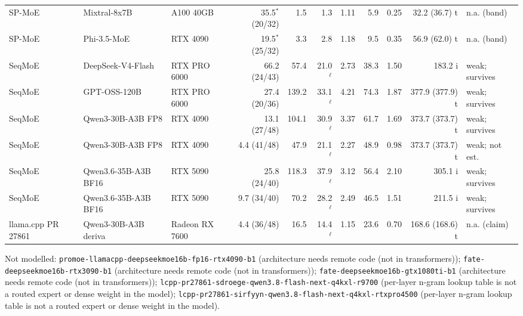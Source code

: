 {\begin{longtable}{p{2.2cm}p{2.1cm}p{1.5cm}rrrrrrrl}
SP-MoE & Mixtral-8x7B & A100 40GB & 35.5$^\ast$ (20/32) & 1.5 & 1.3 & 1.11 & 5.9 & 0.25 & 32.2 (36.7) t & n.a. (band) \\
SP-MoE & Phi-3.5-MoE & RTX 4090 & 19.5$^\ast$ (25/32) & 3.3 & 2.8 & 1.18 & 9.5 & 0.35 & 56.9 (62.0) t & n.a. (band) \\
SeqMoE & DeepSeek-V4-Flash & RTX PRO 6000 & 66.2 (24/43) & 57.4 & 21.0$^\ell$ & 2.73 & 38.3 & 1.50 & 183.2 i & weak; survives \\
SeqMoE & GPT-OSS-120B & RTX PRO 6000 & 27.4 (20/36) & 139.2 & 33.1$^\ell$ & 4.21 & 74.3 & 1.87 & 377.9 (377.9) t & weak; survives \\
SeqMoE & Qwen3-30B-A3B FP8 & RTX 4090 & 13.1 (27/48) & 104.1 & 30.9$^\ell$ & 3.37 & 61.7 & 1.69 & 373.7 (373.7) t & weak; survives \\
SeqMoE & Qwen3-30B-A3B FP8 & RTX 4090 & 4.4 (41/48) & 47.9 & 21.1$^\ell$ & 2.27 & 48.9 & 0.98 & 373.7 (373.7) t & weak; not est. \\
SeqMoE & Qwen3.6-35B-A3B BF16 & RTX 5090 & 25.8 (24/40) & 118.3 & 37.9$^\ell$ & 3.12 & 56.4 & 2.10 & 305.1 i & weak; survives \\
SeqMoE & Qwen3.6-35B-A3B BF16 & RTX 5090 & 9.7 (34/40) & 70.2 & 28.2$^\ell$ & 2.49 & 46.5 & 1.51 & 211.5 i & weak; survives \\
llama.cpp PR 27861 & Qwen3-30B-A3B deriva & Radeon RX 7600 & 4.4 (36/48) & 16.5 & 14.4$^\ell$ & 1.15 & 23.6 & 0.70 & 168.6 (168.6) t & n.a. (claim) \\
\end{longtable}}
Not modelled: \texttt{promoe-llamacpp-deepseekmoe16b-fp16-rtx4090-b1} (architecture needs remote code (not in transformers)); \texttt{fate-deepseekmoe16b-rtx3090-b1} (architecture needs remote code (not in transformers)); \texttt{fate-deepseekmoe16b-gtx1080ti-b1} (architecture needs remote code (not in transformers)); \texttt{lcpp-pr27861-sdroege-qwen3.8-flash-next-q4kxl-r9700} (per-layer n-gram lookup table is not a routed expert or dense weight in the model); \texttt{lcpp-pr27861-sirfyyn-qwen3.8-flash-next-q4kxl-rtxpro4500} (per-layer n-gram lookup table is not a routed expert or dense weight in the model).
